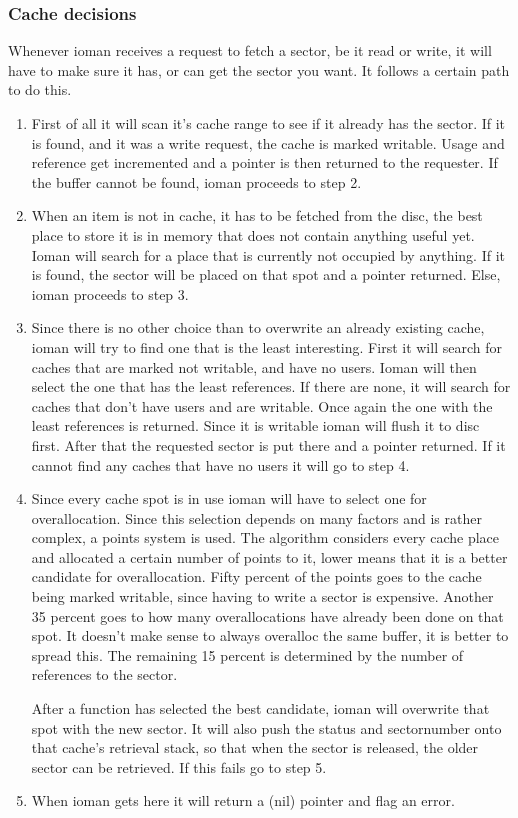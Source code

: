 \subsubsection{Cache decisions}
Whenever ioman receives a request to fetch a sector, be it read or write, it will have to make sure
it has, or can get the sector you want. It follows a certain path to do this.\label{cachemethod}
\begin{enumerate}
	\item First of all it will scan it's cache range to see if it already has the sector.
		If it is found, and it was a write request, the cache is marked writable. Usage and
		reference get incremented and a pointer	is then returned to the requester. If the
		buffer cannot be found, ioman proceeds to step 2.
	\item When an item is not in cache, it has to be fetched from the disc, the best place to
		store it is in memory that does not contain anything useful yet. Ioman will search for
		a place that is currently not occupied by anything. If it is found, the sector will be 
		placed on that spot and a pointer returned. Else, ioman proceeds to step 3.
	\item Since there is no other choice than to overwrite an already existing cache, ioman will
		try to find one that is the least interesting. First it will search for caches that
		are marked not writable, and have no users. Ioman will then select the one that has the
		least references. If there are none, it will search for caches that don't have users and
		are writable. Once again the one with the least references is returned. Since it is 
		writable ioman will flush it to disc first. After that the requested sector is put there
		and a pointer returned. If it cannot find any caches that have no users it will go to
		step 4.
	\item Since every cache spot is in use ioman will have to select one for overallocation.
		Since this selection depends on many factors and is rather complex, a points
		system is used. The algorithm considers every cache place and allocated a certain number
		of points to it, lower means that it is a better candidate for overallocation. Fifty 
		percent of the points goes to the cache being marked writable, since having to write
		a sector is expensive. Another 35 percent goes to how many overallocations have 
		already been done on that spot. It doesn't make sense to always overalloc the same buffer,
		it is better to spread this. The remaining 15 percent is determined by the number of 
		references to the sector. 
		
		After a function has selected the best candidate, ioman will overwrite that spot with
		the new sector. It will also push the status and sectornumber onto that cache's 
		retrieval stack, so that when the sector is released, the older sector can be retrieved.
		If this fails go to step 5.
	\item When ioman gets here it will return a (nil) pointer and flag an error.
\end{enumerate}

